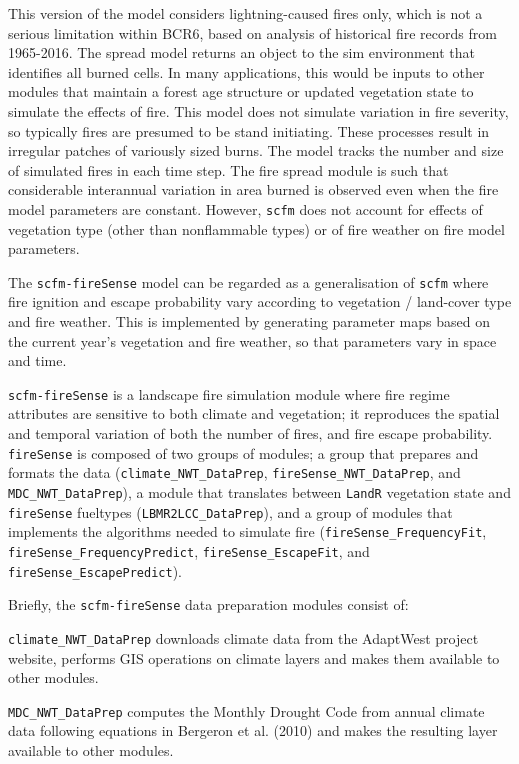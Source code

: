 \documentclass[]{article}
\begin{document}
This version of the model considers lightning-caused fires only, which
is not a serious limitation within BCR6, based on analysis of historical
fire records from 1965-2016. The spread model returns an object to the
sim environment that identifies all burned cells. In many applications,
this would be inputs to other modules that maintain a forest age
structure or updated vegetation state to simulate the effects of fire.
This model does not simulate variation in fire severity, so typically
fires are presumed to be stand initiating. These processes result in
irregular patches of variously sized burns. The model tracks the number
and size of simulated fires in each time step. The fire spread module is
such that considerable interannual variation in area burned is observed
even when the fire model parameters are constant. However, \texttt{scfm}
does not account for effects of vegetation type (other than nonflammable
types) or of fire weather on fire model parameters.

The \texttt{scfm-fireSense} model can be regarded as a generalisation of
\texttt{scfm} where fire ignition and escape probability vary according
to vegetation / land-cover type and fire weather. This is implemented by
generating parameter maps based on the current year's vegetation and
fire weather, so that parameters vary in space and time.

\texttt{scfm-fireSense} is a landscape fire simulation module where fire
regime attributes are sensitive to both climate and vegetation; it
reproduces the spatial and temporal variation of both the number of
fires, and fire escape probability. \texttt{fireSense} is composed of
two groups of modules; a group that prepares and formats the data
(\texttt{climate\_NWT\_DataPrep}, \texttt{fireSense\_NWT\_DataPrep}, and
\texttt{MDC\_NWT\_DataPrep}), a module that translates between
\texttt{LandR} vegetation state and \texttt{fireSense} fueltypes
(\texttt{LBMR2LCC\_DataPrep}), and a group of modules that implements
the algorithms needed to simulate fire
(\texttt{fireSense\_FrequencyFit}, \texttt{fireSense\_FrequencyPredict},
\texttt{fireSense\_EscapeFit}, and \texttt{fireSense\_EscapePredict}).

Briefly, the \texttt{scfm-fireSense} data preparation modules consist
of:

\texttt{climate\_NWT\_DataPrep} downloads climate data from the
AdaptWest project website, performs GIS operations on climate layers and
makes them available to other modules.

\texttt{MDC\_NWT\_DataPrep} computes the Monthly Drought Code from
annual climate data following equations in Bergeron et al. (2010) and
makes the resulting layer available to other modules.
\end{document}
